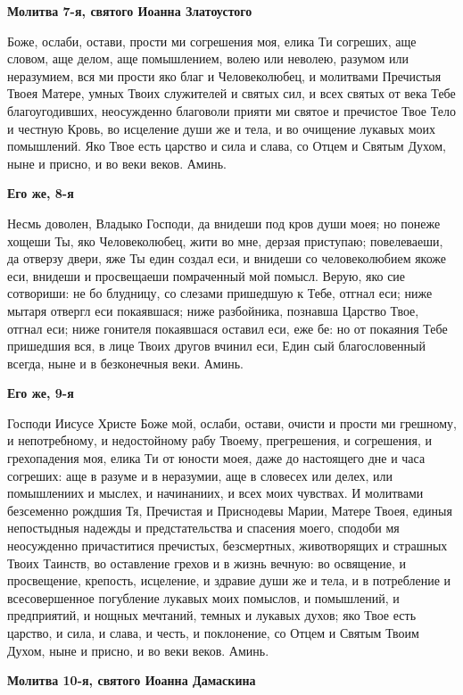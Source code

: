 \medskip
\bfseries Молитва 7-я, святого Иоанна Златоустого\normalfont{}


Боже, ослаби, остави, прости ми согрешения моя, елика Ти согреших, аще словом, аще делом, аще помышлением, волею или неволею, разумом или неразумием, вся ми прости яко благ и Человеколюбец, и молитвами Пречистыя Твоея Матере, умных Твоих служителей и святых сил, и всех святых от века Тебе благоугодивших, неосужденно благоволи прияти ми святое и пречистое Твое Тело и честную Кровь, во исцеление души же и тела, и во очищение лукавых моих помышлений. Яко Твое есть царство и сила и слава, со Отцем и Святым Духом, ныне и присно, и во веки веков. Аминь.

\medskip
\bfseries Его же, 8-я\normalfont{}


Несмь доволен, Владыко Господи, да внидеши под кров души моея; но понеже хощеши Ты, яко Человеколюбец, жити во мне, дерзая приступаю; повелеваеши, да отверзу двери, яже Ты един создал еси, и внидеши со человеколюбием якоже еси, внидеши и просвещаеши помраченный мой помысл. Верую, яко сие сотвориши: не бо блудницу, со слезами пришедшую к Тебе, отгнал еси; ниже мытаря отвергл еси покаявшася; ниже разбойника, познавша Царство Твое, отгнал еси; ниже гонителя покаявшася оставил еси, еже бе: но от покаяния Тебе пришедшия вся, в лице Твоих другов вчинил еси, Един сый благословенный всегда, ныне и в безконечныя веки. Аминь.

\medskip
\bfseries Его же, 9-я\normalfont{}


Господи Иисусе Христе Боже мой, ослаби, остави, очисти и прости ми грешному, и непотребному, и недостойному рабу Твоему, прегрешения, и согрешения, и грехопадения моя, елика Ти от юности моея, даже до настоящего дне и часа согреших: аще в разуме и в неразумии, аще в словесех или делех, или помышлениих и мыслех, и начинаниих, и всех моих чувствах. И молитвами безсеменно рождшия Тя, Пречистая и Приснодевы Марии, Матере Твоея, единыя непостыдныя надежды и предстательства и спасения моего, сподоби мя неосужденно причаститися пречистых, безсмертных, животворящих и страшных Твоих Таинств, во оставление грехов и в жизнь вечную: во освящение, и просвещение, крепость, исцеление, и здравие души же и тела, и в потребление и всесовершенное погубление лукавых моих помыслов, и помышлений, и предприятий, и нощных мечтаний, темных и лукавых духов; яко Твое есть царство, и сила, и слава, и честь, и поклонение, со Отцем и Святым Твоим Духом, ныне и присно, и во веки веков. Аминь.


\medskip
\bfseries Молитва 10-я, святого Иоанна Дамаскина\normalfont{}


